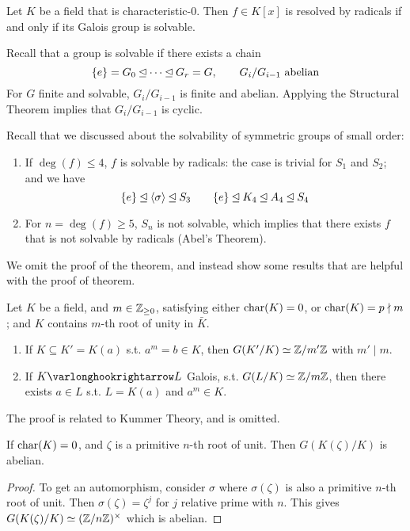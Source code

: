 \begin{theorem}\label{thm: solvable by radicals iff galois group is solvable}
    Let $K$ be a field that is characteristic-0. Then $f \in K[x]$ is resolved by radicals if and only if its Galois group is solvable. 
\end{theorem}

\textstart
Recall that a group is solvable if there exists a chain
\[
    \{e\} = G_0 \unlhd \cdots \unlhd G_r = G, \qquad \text{$G_i/G_{i-1}$ abelian}
\]
For $G$ finite and solvable, $G_i/G_{i-1}$ is finite and abelian. Applying the Structural Theorem implies that $G_i/G_{i-1}$ is cyclic. 

\begin{example}
    Recall that we discussed about the solvability of symmetric groups of small order:
    \begin{enumerate}
        \item If $\deg (f) \leq 4$, $f$ is solvable by radicals: the case is trivial for $S_1$ and $S_2$; and we have
        \[
            \{e\} \unlhd \left\langle \sigma \right\rangle \unlhd S_3 \qquad \{e\} \unlhd K_4 \unlhd A_4 \unlhd S_4
        \]
        \item For $n = \deg(f) \geq 5$, $S_n$ is not solvable, which implies that there exists $f$ that is not solvable by radicals (Abel's Theorem).
    \end{enumerate}
\end{example}

\textstart
We omit the proof of the theorem, and instead show some results that are helpful with the proof of theorem.
\begin{proposition}
    Let $K$ be a field, and $m \in \mathbb{Z}_{\geq 0}$, satisfying either $\mathrm{char}(K) = 0$, or $\mathrm{char}(K) = p \nmid m$; and $K$ contains $m$-th root of unity in $\bar{K}$.
    \begin{enumerate}[label=\arabic*)]
        \item If $K \subseteq K' = K(a)$ s.t. $a^m = b \in K$, then $G(K'/K) \simeq \mathbb{Z}/m'\mathbb{Z}$ with $m' \mid m$.
        \item If $K \ext L$ Galois, s.t. $G(L/K) \simeq \mathbb{Z}/m\mathbb{Z}$, then there exists $a \in L$ s.t. $L = K(a)$ and $a^m \in K$.
    \end{enumerate}
\end{proposition}

\textstart
The proof is related to Kummer Theory, and is omitted.

\begin{lemma}
    If $\mathrm{char}(K) = 0$, and $\zeta$ is a primitive $n$-th root of unit. Then $G(K(\zeta)/K)$ is abelian.
\end{lemma}
\begin{proof}
    To get an automorphism, consider $\sigma$ where $\sigma(\zeta)$ is also a primitive $n$-th root of unit. Then $\sigma(\zeta) = \zeta^j$ for $j$ relative prime with $n$. This gives $G(K(\zeta)/K) \simeq (\mathbb{Z}/n\mathbb{Z})^{\times}$ which is abelian.
\end{proof}